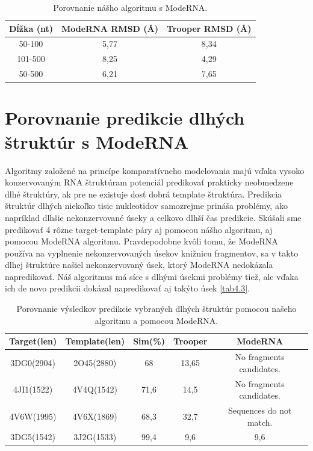 \begin{table}[b!]
\centering
\begin{tabular}{ccc}
\toprule
Dĺžka (nt) & ModeRNA RMSD (Å) & Trooper RMSD (Å) \\
\midrule
50-100    & 5,77 & 8,34  \\
101-500  & 8,25 & 4,29  \\
\bottomrule
50-500  & 6,21 & 7,65  \\
\end{tabular}
\caption{Porovnanie nášho algoritmu s ModeRNA. }\label{tab4.2}
\end{table}

\section{Porovnanie predikcie dlhých štruktúr s ModeRNA}
Algoritmy založené na princípe komparatívneho modelovania majú vďaka vysoko konzervovaným RNA štruktúram potenciál predikovať prakticky neobmedzene dlhé štruktúry, ak pre ne existuje dosť dobrá template štruktúra. Predikcia štruktúr dlhých niekoľko tisic nukleotidov samozrejme prináša problémy, ako napríklad dlhšie nekonzervované úseky a celkovo dlhší čas predikcie. Skúšali sme predikovať 4 rôzne target-template páry aj pomocou nášho algoritmu, aj pomocou ModeRNA algoritmu. Pravdepodobne kvôli tomu, že ModeRNA používa na vyplnenie nekonzervovaných úsekov knižnicu fragmentov, sa v takto dlhej štruktúre našiel nekonzervovaný úsek, ktorý ModeRNA nedokázala napredikovať. Náš algoritmus má síce s dlhými úsekmi problémy tiež, ale vďaka ich de novo predikcii dokázal napredikovať aj takýto úsek \autoref{tab4.3}.

\begin{table}[b!]
\centering
\begin{tabular}{ccccc}
\toprule
Target(len) & Template(len) & Sim(\%) & Trooper & ModeRNA\\
\midrule
3DG0(2904)  & 2O45(2880) & 68  & 13,65 & No fragments candidates.\\
4JI1(1522)  & 4V4Q(1542) & 71,6  & 14,5 &  No fragments candidates.\\
4V6W(1995)  &  4V6X(1869) & 68,3  & 32,7 & Sequences do not match.\\
3DG5(1542)  & 3J2G(1533) &  99,4  & 9,6 & 9,6\\
\bottomrule
\end{tabular}
\caption{Porovnanie výsledkov predikcie vybraných dlhých štruktúr pomocou našeho algoritmu a pomocou ModeRNA. }\label{tab4.3}
\end{table}


